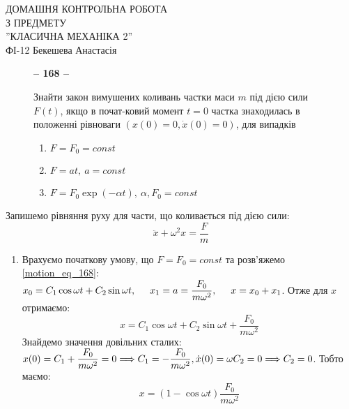 \documentclass[a4paper,12pt]{article}
\newenvironment{task}[1]{\begin{figure*}[htp]\begin{framed}\begin{center}\textbf{-- {#1} --}\end{center}}{\end{framed}\end{figure*}}
\newcommand\tab [1][0.5cm]{\hspace*{#1}}
\begin{document}
	\begin{justify}
 		\thispagestyle{empty}\setlength{\parindent}{0pt}
 		\vspace*{\fill}
  		\begin{center}
  			\noindent\makebox[\linewidth]{\rule{\paperwidth}{0.4pt}}
   			\LARGE{\bigbreak ДОМАШНЯ КОНТРОЛЬНА РОБОТА\\З ПРЕДМЕТУ\\''КЛАСИЧНА МЕХАНІКА 2''\\\bigbreak} 
   			ФІ-12 Бекешева Анастасія 
   			\noindent\makebox[\linewidth]{\rule{\paperwidth}{0.4pt}}
  		\end{center}
 		\vspace*{\fill}\newpage
 		
 		\begin{task}{168}
			Знайти закон вимушених коливань частки маси $m$ під дією сили $F(t)$, якщо в почат-ковий момент $t = 0$ частка знаходилась в положенні рівноваги $(x(0) = 0,\dot{x}(0) = 0)$, для випадків
			\begin{enumerate}[label=\alph*)]
				\item $F=F_0=const$
				\item $F=at,\>a=const$
				\item $F=F_0\exp(-\alpha t),\>\alpha,F_0=const$
			\end{enumerate}
		\end{task}
 		 Запишемо рівняння руху для части, що коливається під дією сили:
 		 \begin{equation}
 		 	\ddot{x}+\omega^2x=\dfrac{F}{m}
 		 	\label{motion_eq_168}
 		 \end{equation}
 		 \begin{enumerate}[label=\alph*)]
				\item Врахуємо початкову умову, що $F=F_0=const$ та розв'яжемо  \cref{motion_eq_168}: $\\x_0=C_1\cos\omega t+C_2\sin\omega t,\tab x_1=a=\dfrac{F_0}{m\omega^2},\tab x=x_0+x_1$. Отже для $x$ отримаємо:
					\begin{equation}
						x=C_1\cos\omega t+C_2\sin\omega t+\dfrac{F_0}{m\omega^2}
						\label{x_168a}
					\end{equation} 
					Знайдемо значення довільних сталих: $x(0)=C_1+\dfrac{F_0}{m\omega^2}=0\Longrightarrow C_1=-\dfrac{F_0}{m\omega^2},\\\dot{x}(0)=\omega C_2=0\Longrightarrow C_2=0$.	 Тобто маємо:
					\begin{equation}
						x=(1-\cos\omega t)\dfrac{F_0}{m\omega^2}

\end{equation}
\end{enumerate}
\end{justify}
\end{document}
